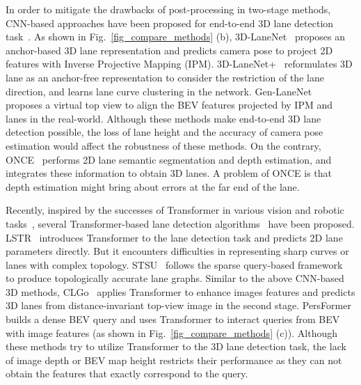 \documentclass[letterpaper, 10 pt, conference]{ieeeconf}
\begin{document}
In order to mitigate the drawbacks of post-processing in two-stage methods, CNN-based approaches have been proposed for end-to-end 3D lane detection task~\cite{garnett20193d,efrat20203d,guo2020gen,yan2022once}. As shown in Fig.~\ref{fig_compare_methods} (b), 3D-LaneNet~\cite{garnett20193d} proposes an anchor-based 3D lane representation and predicts camera pose to project 2D features with Inverse Projective Mapping (IPM). 3D-LaneNet+~\cite{efrat20203d} reformulates 3D lane as an anchor-free 
representation to consider the restriction of the lane direction, and learns lane curve clustering in the network. Gen-LaneNet~\cite{guo2020gen} proposes a virtual top view to align the BEV features projected by IPM and lanes in the real-world. Although these methods make end-to-end 3D lane detection possible, the loss of lane height and the accuracy of camera pose estimation would affect the robustness of these methods. On the contrary, ONCE~\cite{yan2022once} performs 2D lane semantic segmentation and depth estimation, and integrates these information to obtain 3D lanes. A problem of ONCE is that  depth estimation might bring about errors at the far end of the lane.

Recently, inspired by the successes of Transformer in various vision and robotic tasks~\cite{dosovitskiy2020image, carion2020end,wang2022detr3d,peng2022bevsegformer},
several Transformer-based lane detection algorithms~\cite{liu2021end,liu2022learning,chen2022persformer} have been proposed. LSTR~\cite{liu2021end} introduces Transformer to the lane detection task and predicts 2D lane parameters directly. But it encounters difficulties in representing sharp curves or lanes with complex topology. STSU~\cite{can2021structured} follows the sparse query-based framework~\cite{wang2022detr3d} to produce topologically accurate lane graphs. Similar to the above CNN-based 3D methods, CLGo~\cite{liu2022learning} applies Transformer to enhance images features and predicts 3D lanes from distance-invariant top-view image in the second stage. PersFormer~\cite{chen2022persformer} builds a dense BEV query and uses Transformer to interact queries from BEV with image features (as shown in Fig.~\ref{fig_compare_methods} (c)). Although these methods try to utilize Transformer to the 3D lane detection task, the lack of image depth or BEV map height restricts their performance as they can not obtain the features that exactly correspond to the query. 
\end{document}
